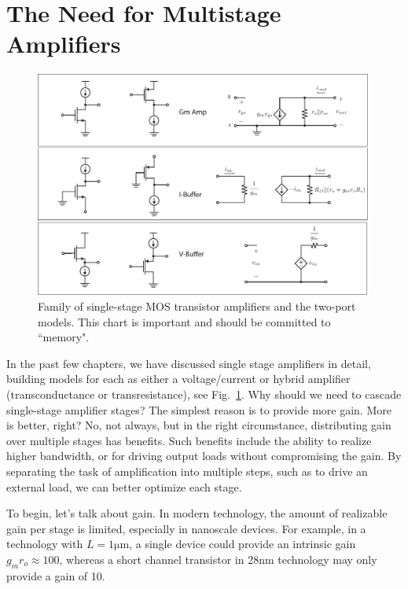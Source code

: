 \section{The Need for Multistage Amplifiers}

\begin{figure}[tb]
\begin{center}
\includegraphics[width=\columnwidth]{ampchart_models}
\end{center}
\caption{Family of single-stage MOS transistor amplifiers and the two-port models.  This chart is important and should be committed to ``memory".} \label{fig:ampchart_models}
\end{figure}

In the past few chapters, we have discussed single stage amplifiers in detail, building models for each as either a voltage/current or hybrid amplifier (transconductance or transresistance), see Fig.~\ref{fig:ampchart_models}.  Why should we need to cascade single-stage amplifier stages?  The simplest reason is to provide more gain.   More is better, right? No, not always, but in the right circumstance, distributing gain over multiple stages has benefits. Such benefits include the ability to realize higher bandwidth, or for driving output loads without compromising the gain.  By separating the task of amplification into multiple steps, such as to drive an external load, we can better optimize each stage.

To begin, let's talk about gain.  In modern technology, the amount of realizable gain per stage is  limited, especially in nanoscale devices.  For example, in a technology with $L = 1\mathrm{\mu m}$, a single device could provide an intrinsic gain $g_m r_o \approx 100$, whereas a short channel transistor in 28nm technology may only provide a gain of 10.  
 
